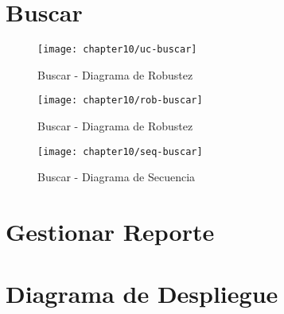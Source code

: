     
\section{Buscar}

\begin{figure}[H]
        \centering
        \texttt{[image: chapter10/uc-buscar]}
        \caption{Buscar - Diagrama de Robustez}
        \label{fig:uc-buscar}
    \end{figure}
    
 \begin{landscape}
    \begin{figure}[H]
        \centering
        \texttt{[image: chapter10/rob-buscar]}
        \caption{Buscar - Diagrama de Robustez}
        \label{fig:rob-buscar}
    \end{figure}
    
    \begin{figure}[H]
        \centering
        \texttt{[image: chapter10/seq-buscar]}
        \caption{Buscar - Diagrama de Secuencia }
        \label{fig:seq-buscar}
    \end{figure}
    \end{landscape}
    
\section{Gestionar Reporte}


\section{Diagrama de Despliegue}

